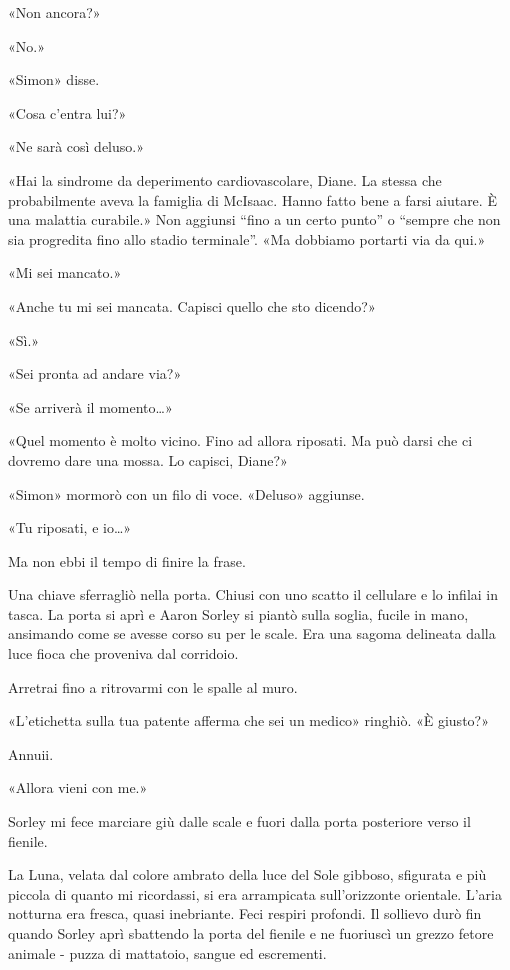 «Non ancora?»

«No.»

«Simon» disse.

«Cosa c'entra lui?»

«Ne sarà così deluso.»

«Hai la sindrome da deperimento cardiovascolare, Diane. La stessa che
probabilmente aveva la famiglia di McIsaac. Hanno fatto bene a farsi
aiutare. È una malattia curabile.» Non aggiunsi ``fino a un certo
punto'' o ``sempre che non sia progredita fino allo stadio terminale''.
«Ma dobbiamo portarti via da qui.»

«Mi sei mancato.»

«Anche tu mi sei mancata. Capisci quello che sto dicendo?»

«Sì.»

«Sei pronta ad andare via?»

«Se arriverà il momento\ldots»

«Quel momento è molto vicino. Fino ad allora riposati. Ma può darsi che
ci dovremo dare una mossa. Lo capisci, Diane?»

«Simon» mormorò con un filo di voce. «Deluso» aggiunse.

«Tu riposati, e io\ldots»

Ma non ebbi il tempo di finire la frase.

Una chiave sferragliò nella porta. Chiusi con uno scatto il cellulare e
lo infilai in tasca. La porta si aprì e Aaron Sorley si piantò sulla
soglia, fucile in mano, ansimando come se avesse corso su per le scale.
Era una sagoma delineata dalla luce fioca che proveniva dal corridoio.

Arretrai fino a ritrovarmi con le spalle al muro.

«L'etichetta sulla tua patente afferma che sei un medico» ringhiò. «È
giusto?»

Annuii.

«Allora vieni con me.»

\separatorefiori

Sorley mi fece marciare giù dalle scale e fuori dalla porta posteriore
verso il fienile.

La Luna, velata dal colore ambrato della luce del Sole gibboso,
sfigurata e più piccola di quanto mi ricordassi, si era arrampicata
sull'orizzonte orientale. L'aria notturna era fresca, quasi inebriante.
Feci respiri profondi. Il sollievo durò fin quando Sorley aprì sbattendo
la porta del fienile e ne fuoriuscì un grezzo fetore animale - puzza di
mattatoio, sangue ed escrementi.

